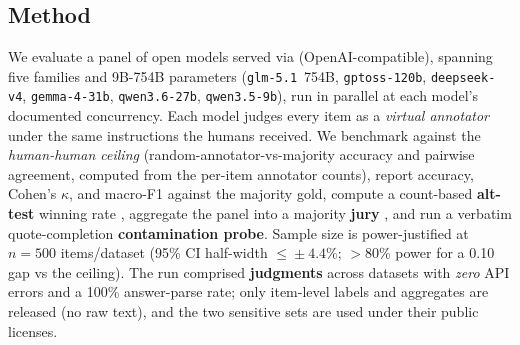 \subsection{Method}
We evaluate a panel of \STHRmodels{} open models served via \textbf{\PROVIDER{}} (OpenAI-compatible),
spanning five families and 9B-754B parameters (\texttt{glm-5.1}~754B, \texttt{gptoss-120b}, \texttt{deepseek-v4},
\texttt{gemma-4-31b}, \texttt{qwen3.6-27b}, \texttt{qwen3.5-9b}), run in parallel at each model's documented
concurrency. Each model judges every item as a \emph{virtual annotator} under the same instructions the humans
received. We benchmark against the \emph{human-human ceiling} (random-annotator-vs-majority accuracy and pairwise
agreement, computed from the per-item annotator counts), report accuracy, Cohen's $\kappa$, and macro-F1 against the
majority gold, compute a count-based \textbf{alt-test} winning rate \citep{calderon2025alttest}, aggregate the panel
into a majority \textbf{jury} \citep{verga2024poll}, and run a verbatim quote-completion \textbf{contamination
probe}. Sample size is power-justified at $n{=}500$ items/dataset (95\% CI half-width $\le\!\pm4.4\%$; $>$80\% power
for a 0.10 gap vs the ceiling). The run comprised \textbf{\STHRn{} judgments} across \STHRdatasets{} datasets with
\emph{zero} API errors and a 100\% answer-parse rate; only item-level labels and aggregates are released (no raw
text), and the two sensitive sets are used under their public licenses.

